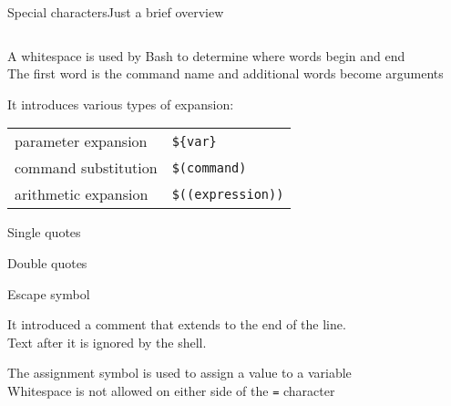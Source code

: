 \begin{frame}[fragile]{Special characters}{Just a brief overview}
    \vspace{-6mm}
    \begin{columns}
        \begin{column}{\dimexpr\paperwidth-10mm}
            \begin{description}[\texttt{>  >>  <}]
                \setlength{\itemsep}{1mm}
                \item<only@1>[\texttt{\textvisiblespace}]
                    A \alert{white}\alert{space} is used by Bash to determine where words begin and end \\
                    The first word is the command name and additional words become arguments
                \item<only@1>[\texttt{\$}]
                    It introduces various types of \alert{expansion}:
                    \begin{tabular}{ll}
                        \PB{$\bullet\;$} parameter expansion   & \texttt{\$\{var\}}          \\
                        \PB{$\bullet\;$} command substitution  & \texttt{\$(command)}      \\
                        \PB{$\bullet\;$} arithmetic expansion  & \texttt{\$((expression))} \\
                    \end{tabular}
                \item<only@1>[\texttt{' '}] \alert{Single quotes}
                \item<only@1>[\texttt{" "}] \alert{Double quotes}
                \item<only@1>[\texttt{\textbackslash}] \alert{Escape symbol}
                \item<only@1>[\texttt{\#}]
                    It introduced a \alert{comment} that extends to the end of the line. \\
                    Text after it is ignored by the shell. 
                \item<only@2>[\texttt{=}]
                    The \alert{assignment} symbol is used to assign a value to a variable \\
                    Whitespace is not allowed on either side of the \texttt{=} character
                \item<only@2>[\texttt{[[ ]]}]

\end{description}
\end{column}
\end{columns}
\end{frame}

